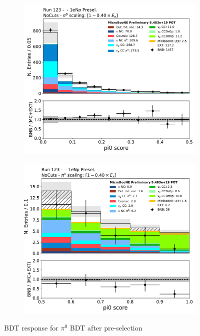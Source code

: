 \begin{figure}[H] 
\begin{center}
    \begin{subfigure}[b]{0.45\textwidth}
    \centering
    \includegraphics[width=1.00\textwidth]{1eNp/pi0_score_presel_low.pdf}
    \caption{\label{fig:1eNp:bdt:pi0:low}}
    \end{subfigure}
    \begin{subfigure}[b]{0.45\textwidth}
    \centering
    \includegraphics[width=1.00\textwidth]{1eNp/pi0_score_presel_high.pdf}
    \caption{\label{fig:1eNp:bdt:pi0:high}}
    \end{subfigure}
\caption{\label{fig:1eNp:bdt:pi0}BDT response for $\pi^0$ BDT after \npsel pre-selection}
\end{center}
\end{figure}

